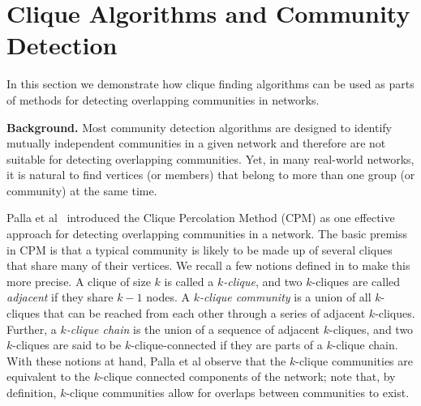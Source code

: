 \section{Clique Algorithms and Community Detection}
\label{sec:applications}

In this section we demonstrate how clique finding algorithms can be used as 
parts of methods for detecting overlapping communities in networks. 


{\bf Background. }
Most community detection algorithms are designed to identify mutually independent communities in a given network and therefore are not suitable for detecting overlapping communities. Yet, in many real-world networks, it is natural to find vertices (or members) that belong to more than one group (or community) at the same time.

Palla et al~\cite{cite-key} introduced the Clique Percolation Method (CPM) 
as one effective approach for detecting overlapping communities in a network. 
The basic premiss in CPM is that a typical community is likely to be made up of several cliques that share many of their vertices.  
We recall a few notions defined in \cite{cite-key} to make this more precise.
A clique of size $k$ is called a {\em $k$-clique}, and   
two $k$-cliques are called {\em adjacent} if they share $k - 1$ nodes. 
A {\em $k$-clique community} is a union of all $k$-cliques that can be reached 
from each other through a series of adjacent $k$-cliques. 
Further, a {\em $k$-clique chain} is the union of a sequence of adjacent $k$-cliques, and
two $k$-cliques are said to be $k$-clique-connected if they are parts of a $k$-clique chain. With these notions at hand, Palla et al observe that the $k$-clique communities are  
equivalent to the $k$-clique connected components of the network; 
note that, by definition, $k$-clique communities allow for
overlaps between communities to exist.

